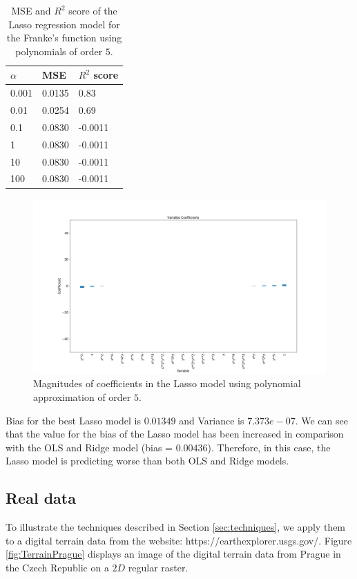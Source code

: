 \documentclass [11pt]{article}
\begin{document}
\begin{table}[H]
\centering
\begin{tabular}{lll}
\hline
$\alpha$ & MSE    & $R^{2}$ score \\ \hline
0.001     & 0.0135 & 0.83          \\
0.01      & 0.0254 & 0.69          \\
0.1       & 0.0830 & -0.0011       \\
1         & 0.0830 & -0.0011       \\
10        & 0.0830 & -0.0011       \\
100       & 0.0830 & -0.0011       \\ \hline
\end{tabular}
\caption{MSE and $R^{2}$ score of the Lasso regression model for the Franke's function using polynomials of order $5$.}
\label{tab:LassoFranke5}
\end{table}

\begin{figure}[H]
\centering
\includegraphics[width=1\textwidth]{figures/coeffLasso.png}
        \caption{Magnitudes of coefficients in the Lasso model using polynomial approximation of order $5$.}
        \label{fig:coeffLasso}
\end{figure}

Bias for the best Lasso model is $0.01349$ and Variance is $7.373e-07$. We can see that the value for the bias of the Lasso model has been increased in comparison with the OLS and Ridge model (bias = $0.00436$). Therefore, in this case, the Lasso model is predicting worse than both OLS and Ridge models.

\subsection{Real data}
\label{sec:realdata}
To illustrate the techniques described in Section \ref{sec:techniques}, we apply them to a digital terrain data from the website: https://earthexplorer.usgs.gov/. Figure \ref{fig:TerrainPrague} displays an image of the digital terrain data from Prague in the Czech Republic on a $2D$ regular raster. \\
\end{document}
